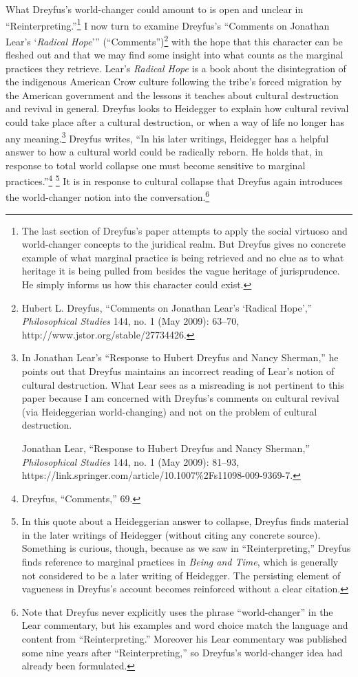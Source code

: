 What Dreyfus's world-changer could amount to is open and unclear in
``Reinterpreting.''\footnote{The last section of Dreyfus's paper
  attempts to apply the social virtuoso and world-changer concepts to
  the juridical realm. But Dreyfus gives no concrete example of what
  marginal practice is being retrieved and no clue as to what heritage
  it is being pulled from besides the vague heritage of jurisprudence.
  He simply informs us how this character could exist.} I now turn to
examine Dreyfus's ``Comments on Jonathan Lear's `\emph{Radical Hope}'''
(``Comments'')\footnote{Hubert L. Dreyfus, ``Comments on Jonathan Lear's
  `Radical Hope','' \emph{Philosophical Studies} 144, no. 1 (May 2009):
  63--70, http://www.jstor.org/stable/27734426.} with the hope that this
character can be fleshed out and that we may find some insight into what
counts as the marginal practices they retrieve. Lear's \emph{Radical
Hope} is a book about the disintegration of the indigenous American Crow
culture following the tribe's forced migration by the American
government and the lessons it teaches about cultural destruction and
revival in general. Dreyfus looks to Heidegger to explain how cultural
revival could take place after a cultural destruction, or when a way of
life no longer has any meaning.\footnote{In Jonathan Lear's ``Response
  to Hubert Dreyfus and Nancy Sherman,'' he points out that Dreyfus
  maintains an incorrect reading of Lear's notion of cultural
  destruction. What Lear sees as a misreading is not pertinent to this
  paper because I am concerned with Dreyfus's comments on cultural
  revival (via Heideggerian world-changing) and not on the problem of
  cultural destruction.

  Jonathan Lear, ``Response to Hubert Dreyfus and Nancy Sherman,''
  \emph{Philosophical Studies} 144, no. 1 (May 2009): 81--93,
  https://link.springer.com/article/10.1007\%2Fs11098-009-9369-7.}
Dreyfus writes, ``In his later writings, Heidegger has a helpful answer
to how a cultural world could be radically reborn. He holds that, in
response to total world collapse one must become sensitive to marginal
practices.''\footnote{Dreyfus, ``Comments,'' 69.} \footnote{In this
  quote about a Heideggerian answer to collapse, Dreyfus finds material
  in the later writings of Heidegger (without citing any concrete
  source). Something is curious, though, because as we saw in
  ``Reinterpreting,'' Dreyfus finds reference to marginal practices in
  \emph{Being and Time}, which is generally not considered to be a later
  writing of Heidegger. The persisting element of vagueness in Dreyfus's
  account becomes reinforced without a clear citation.} It is in
response to cultural collapse that Dreyfus again introduces the
world-changer notion into the conversation.\footnote{Note that Dreyfus
  never explicitly uses the phrase ``world-changer'' in the Lear
  commentary, but his examples and word choice match the language and
  content from ``Reinterpreting.'' Moreover his Lear commentary was
  published some nine years after ``Reinterpreting,'' so Dreyfus's
  world-changer idea had already been formulated.}

